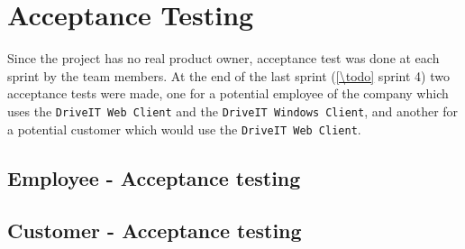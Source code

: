 \section{Acceptance Testing}
Since the project has no real product owner, acceptance test was done at each sprint by the team members. At the end of the last sprint (\ref{\todo} sprint 4) two acceptance tests were made, one for a potential employee of the company which uses the \texttt{DriveIT Web Client} and the \texttt{DriveIT Windows Client}, and another for a potential customer which would use the \texttt{DriveIT Web Client}.
\subsection{Employee - Acceptance testing}

\subsection{Customer - Acceptance testing}